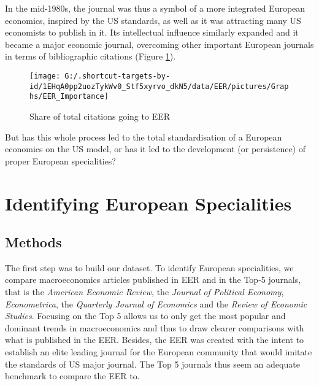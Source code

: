 \documentclass[]{elsarticle} %
\begin{document}
In the mid-1980s, the journal was thus a symbol of a more integrated
European economics, inspired by the US standards, as well as it was
attracting many US economists to publish in it. Its intellectual
influence similarly expanded and it became a major economic journal,
overcoming other important European journals in terms of bibliographic
citations (Figure \ref{fig:plot-eer-importance}).

\begin{figure}[h]

{\centering \texttt{[image: G:/.shortcut-targets-by-id/1EHqA0pp2uozTykWv0\_Stf5xyrvo\_dkN5/data/EER/pictures/Graphs/EER\_Importance]} 

}

\caption{Share of total citations going to EER}\label{fig:plot-eer-importance}
\end{figure}

But has this whole process led to the total standardisation of a
European economics on the US model, or has it led to the development (or
persistence) of proper European specialities?

\hypertarget{european-specialities}{%
\section{Identifying European
Specialities}\label{european-specialities}}

\hypertarget{methods}{%
\subsection{Methods}\label{methods}}

The first step was to build our dataset. To identify European
specialities, we compare macroeconomics articles published in EER and in
the Top-5 journals, that is the \emph{American Economic Review}, the
\emph{Journal of Political Economy}, \emph{Econometrica}, the
\emph{Quarterly Journal of Economics} and the \emph{Review of Economic
Studies}. Focusing on the Top 5 allows us to only get the most popular
and dominant trends in macroeconomics and thus to draw clearer
comparisons with what is published in the EER. Besides, the EER was
created with the intent to establish an elite leading journal for the
European community that would imitate the standards of US major journal.
The Top 5 journals thus seem an adequate benchmark to compare the EER
to.
\end{document}
